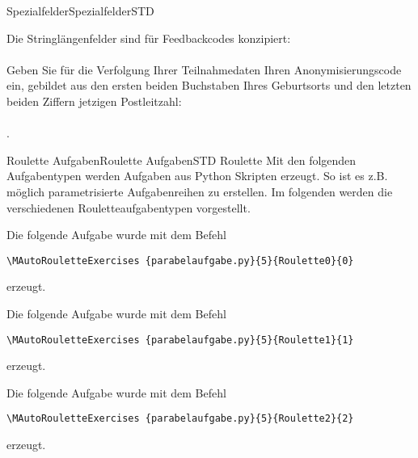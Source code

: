 \begin{MXContent}{Spezialfelder}{Spezialfelder}{STD}
\begin{MExample}
Die Stringlängenfelder sind für Feedbackcodes konzipiert:
\ \\ \ \\
Geben Sie für die Verfolgung Ihrer Teilnahmedaten Ihren Anonymisierungscode ein, gebildet aus den ersten beiden Buchstaben Ihres Geburtsorts
und den letzten beiden Ziffern jetzigen Postleitzahl:
\ \\ \ \\
.
\end{MExample}

\end{MXContent}

\begin{MXContent}{Roulette Aufgaben}{Roulette Aufgaben}{STD}
Roulette
Mit den folgenden Aufgabentypen werden Aufgaben aus Python Skripten erzeugt. So ist es z.B.
möglich parametrisierte Aufgabenreihen zu erstellen. Im folgenden werden die verschiedenen
Rouletteaufgabentypen vorgestellt.

Die folgende Aufgabe wurde mit dem Befehl
\begin{verbatim}
\MAutoRouletteExercises {parabelaufgabe.py}{5}{Roulette0}{0}
\end{verbatim}
erzeugt.

Die folgende Aufgabe wurde mit dem Befehl
\begin{verbatim}
\MAutoRouletteExercises {parabelaufgabe.py}{5}{Roulette1}{1}
\end{verbatim}
erzeugt.

Die folgende Aufgabe wurde mit dem Befehl
\begin{verbatim}
\MAutoRouletteExercises {parabelaufgabe.py}{5}{Roulette2}{2}
\end{verbatim}
erzeugt.


\end{MXContent}

